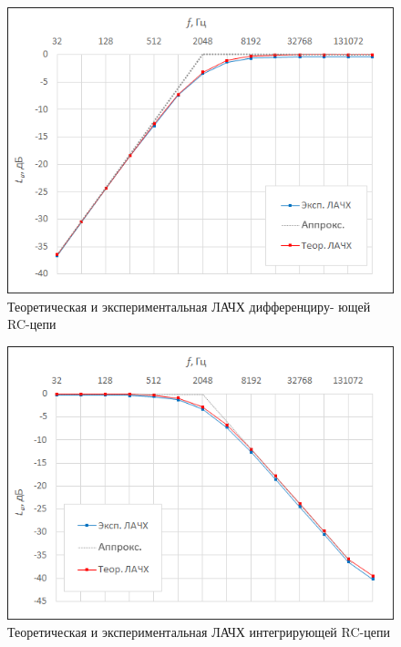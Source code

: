 \begin{figure}[H]
	\begin{center}
		\includegraphics[width=13cm]{1}
		\caption{Теоретическая и экспериментальная ЛАЧХ дифференциру-
ющей RC-цепи
} 
		\label{t:e1} %
	\end{center}
\end{figure}

\begin{figure}[H]
	\begin{center}
		\includegraphics[width=13cm]{2}
		\caption{Теоретическая и экспериментальная ЛАЧХ интегрирующей
RC-цепи} 
		\label{t:e2} %
	\end{center}
\end{figure}


